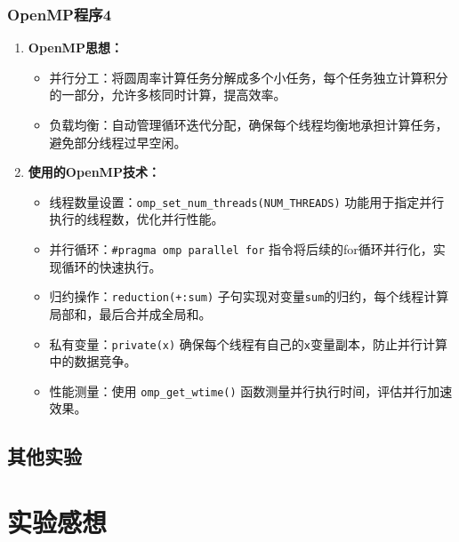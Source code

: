 \documentclass{article}
\begin{document}
\subsubsection{OpenMP程序4}
\begin{enumerate}
    \item \textbf{OpenMP思想：}
    \begin{itemize}
        \item 并行分工：将圆周率计算任务分解成多个小任务，每个任务独立计算积分的一部分，允许多核同时计算，提高效率。
        \item 负载均衡：自动管理循环迭代分配，确保每个线程均衡地承担计算任务，避免部分线程过早空闲。
    \end{itemize}
    
    \item \textbf{使用的OpenMP技术：}
    \begin{itemize}
        \item 线程数量设置：\texttt{omp\_set\_num\_threads(NUM\_THREADS)} 功能用于指定并行执行的线程数，优化并行性能。
        \item 并行循环：\texttt{\#pragma omp parallel for} 指令将后续的for循环并行化，实现循环的快速执行。
        \item 归约操作：\texttt{reduction(+:sum)} 子句实现对变量\texttt{sum}的归约，每个线程计算局部和，最后合并成全局和。
        \item 私有变量：\texttt{private(x)} 确保每个线程有自己的\texttt{x}变量副本，防止并行计算中的数据竞争。
        \item 性能测量：使用 \texttt{omp\_get\_wtime()} 函数测量并行执行时间，评估并行加速效果。
    \end{itemize}
\end{enumerate}
\subsection{其他实验}
\section{实验感想}
\newpage
\appendix
\end{document}
